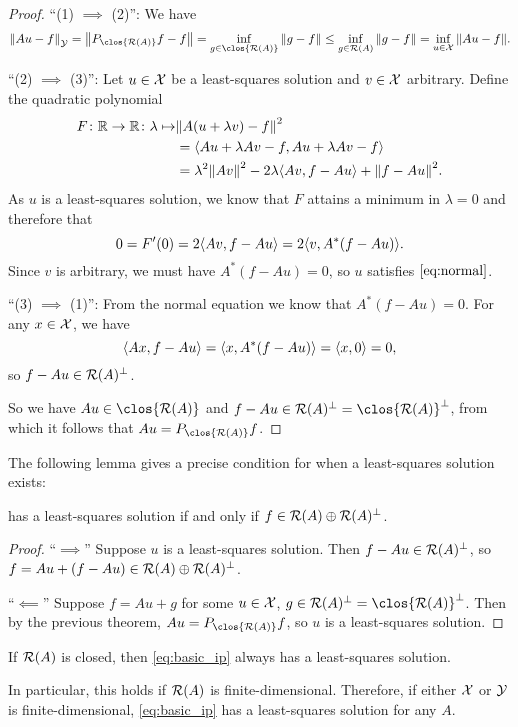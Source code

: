 \begin{proof}
     ``(1) $\implies$ (2)'': We have
     \[
     \norm{Au - f}_\YYY = \norm{ P_{\clos{\Ran(A)} }f - f} = \inf_{g \in \clos{\Ran(A)}} \norm{g - f} \leq \inf_{g \in \Ran(A)} \norm{g - f} = \inf_{u \in \XXX} \norm{Au - f}. 
     \]
     
     ``(2) $\implies$ (3)'':  Let $u \in \mathcal X$ be a least-squares solution and $v \in \mathcal X$ arbitrary. Define the quadratic polynomial 
     \begin{align*}
     F \colon \mathbb R \to \mathbb R \colon \lambda \mapsto & \norm{A(u + \lambda v) - f}^2 \\
     &= \langle Au + \lambda Av - f, Au + \lambda Av - f\rangle \\
     &= \lambda^2 \norm{Av}^2 - 2\lambda \langle Av, f - Au\rangle + \norm{f - Au}^2. 
     \end{align*}
    As $u$ is a least-squares solution, we know that $F$ attains a minimum in $\lambda =0 $ and therefore that 
    \[
    0 = F'(0) = 2\langle Av, f - Au\rangle = 2 \langle v, A^*(f - Au)\rangle.
    \]
    Since $v$ is arbitrary, we must have $A^*(f - Au) = 0$, so $u$ satisfies $\cref{eq:normal}$. 
    
    ``(3) $\implies$ (1)'':  From the normal equation we know that $A^*(f - Au) = 0$. For any $x \in \mathcal X$, we have
    \[
    \langle Ax, f - Au\rangle = \langle x, A^*(f - Au)\rangle = \langle x, 0\rangle = 0,
    \]
    so $f - Au \in \operatorname{\mathcal R}(A)^\perp$. 
    
    So we have $Au \in \clos{\Ran(A)}$ and $f - Au \in \Ran(A)\P = \clos{\Ran(A)}\P$, from which it follows that $Au = P_{\clos{\Ran(A)}}f$. 
\end{proof}

The following lemma gives a precise condition for when a least-squares solution exists: 
\begin{lemma}
     has a least-squares solution if and only if $f \in \operatorname{\mathcal R}(A) \oplus \operatorname{\mathcal R}(A)^\perp$. 
\end{lemma}

\begin{proof}
    ``$\implies$'' Suppose $u$ is a least-squares solution. Then $f - Au \in \operatorname{\mathcal R}(A)^\perp$, so $f = Au + (f - Au) \in \operatorname{\mathcal R}(A) \oplus \operatorname{\mathcal R}(A)^\perp$.
    
    ``$\impliedby$'' Suppose $f = Au + g$ for some $u \in \mathcal X$, $g \in \Ran(A)\P = \clos{\Ran(A)}\P$. Then by the previous theorem, $Au = P_{\clos{\Ran(A)}}f$, so $u$ is a least-squares solution. 
\end{proof}

\begin{corollary}
    If $\operatorname{\mathcal R}(A)$ is closed, then \cref{eq:basic_ip} always has a least-squares solution. 
\end{corollary}
In particular, this holds if $\operatorname{\mathcal R}(A)$ is finite-dimensional. Therefore, if either $\mathcal X$ or $\mathcal Y$ is finite-dimensional, \cref{eq:basic_ip} has a least-squares solution for any $A$. 

